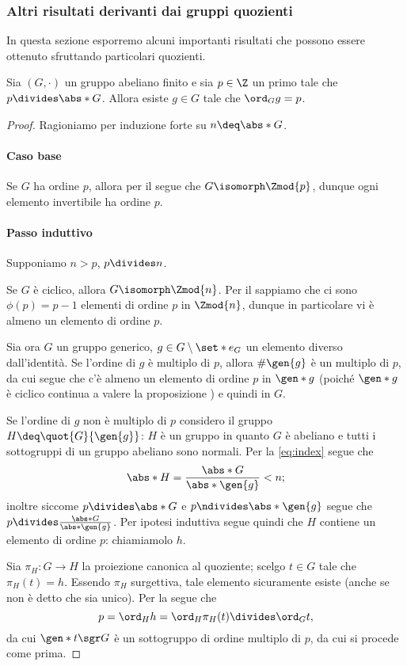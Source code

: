 \subsubsection{Altri risultati derivanti dai gruppi quozienti}
In questa sezione esporremo alcuni importanti risultati che possono essere ottenuto sfruttando particolari quozienti.

\begin{theorem}
    Sia $(G, \cdot)$ un gruppo abeliano finito e sia $p \in \Z$ un primo tale che $p \divides \abs*{G}$. 
    Allora esiste $g \in G$ tale che $\ord_{G}{g} = p$.
\end{theorem}
\begin{proof}
    Ragioniamo per induzione forte su $n \deq \abs*{G}$.
    \paragraph{Caso base}
    Se $G$ ha ordine $p$, allora per il  segue che $G \isomorph \Zmod{p}$, dunque ogni elemento invertibile ha ordine $p$.

    \paragraph{Passo induttivo} Supponiamo $n > p$,  $p \divides n$.

    Se $G$ è ciclico, allora $G \isomorph \Zmod{n}$. Per il  sappiamo che ci sono $\phi(p) = p-1$ elementi di ordine $p$ in $\Zmod{n}$, dunque in particolare vi è almeno un elemento di ordine $p$.

    Sia ora $G$ un gruppo generico, $g \in G \setminus \set*{e_G}$ un elemento diverso dall'identità. 
    Se l'ordine di $g$ è multiplo di $p$, allora $\#\gen{g}$ è un multiplo di  $p$, da cui segue che c'è almeno un elemento di ordine $p$ in $\gen*{g}$ 
    (poiché $\gen*{g}$ è ciclico continua a valere la proposizione ) e quindi in $G$.

    Se l'ordine di $g$ non è multiplo di $p$ considero il gruppo $H \deq \quot{G}{\gen{g}}$: 
    $H$ è un gruppo in quanto $G$ è abeliano e tutti i sottogruppi di un gruppo abeliano sono normali. 
    Per la \eqref{eq:index} segue che \[
        \abs*{H} = \frac{\abs*{G}}{\abs*{\gen{g}}} < n;
    \] inoltre siccome $p \divides \abs*{G}$ e $p \ndivides \abs*{\gen{g}}$
    segue che $p \divides \frac{\abs*{G}}{\abs*{\gen{g}}}$. Per ipotesi induttiva segue quindi che $H$ contiene un elemento di ordine $p$: chiamiamolo $h$.

    Sia $\pi_H : G \to H$ la proiezione canonica al quoziente; scelgo $t \in G$ tale che $\pi_H(t) = h$.
    Essendo $\pi_H$ surgettiva, tale elemento sicuramente esiste (anche se non è detto che sia unico). Per la  segue che  \[
        p = \ord_{H}{h} = \ord_{H}{\pi_H(t)} \divides \ord_{G}{t}, 
    \] da cui $\gen*{t} \sgr G$ è un sottogruppo di ordine multiplo di $p$, da cui si procede come prima.    
\end{proof}

